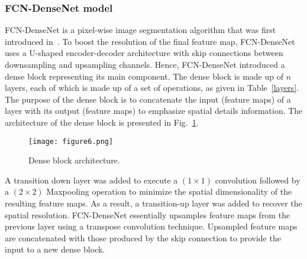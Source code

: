\subsubsection{FCN-DenseNet model}
FCN-DenseNet is a pixel-wise image segmentation algorithm that was first introduced in~\cite{Jegou}.
To boost the resolution of the final feature map, FCN-DenseNet uses a U-shaped encoder-decoder architecture with skip connections between downsampling and upsampling channels.
Hence, FCN-DenseNet introduced a dense block representing its main component.
The dense block is made up of \(n\) layers, each of which is made up of a set of operations, as given in Table~\ref{layers}.
The purpose of the dense block is to concatenate the input (feature maps) of a layer with its output (feature maps) to emphasize spatial details information.
The architecture of the dense block is presented in Fig.~\ref{dense_block}. 
\begin{figure} [h!]
	\begin{center}
		\texttt{[image: figure6.png]}
	\end{center}
	\caption{Dense block architecture.} 
	\label{dense_block}
\end{figure}

A transition down layer was added to execute a \((1\times 1)\) convolution followed by a \((2\times 2)\) Maxpooling operation to minimize the spatial dimensionality of the resulting feature maps.
As a result, a transition-up layer was added to recover the spatial resolution.
FCN-DenseNet essentially upsamples feature maps from the previous layer using a transpose convolution technique.
Upsampled feature maps are concatenated with those produced by the skip connection to provide the input to a new dense block.

